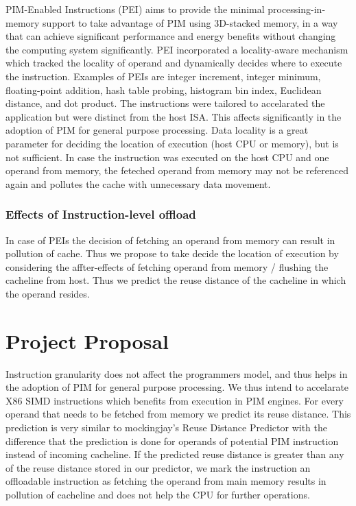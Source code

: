 \documentclass[a4paper,12pt, final]{report}
\begin{document}
PIM-Enabled Instructions (PEI)\cite{PEI_ISCA} aims to provide the minimal processing-in-memory 
support to take advantage of PIM using 3D-stacked memory, in
a way that can achieve significant performance and energy benefits without changing the 
computing system significantly. PEI incorporated a locality-aware mechanism
which tracked the locality of operand and dynamically decides where to execute
the instruction. Examples of PEIs are integer increment, integer minimum, floating-point 
addition, hash table probing, histogram bin index, Euclidean distance, and dot
product. The instructions were tailored to accelarated the application but were distinct 
from the host ISA. This affects significantly in the adoption of PIM for general
purpose processing. Data locality is a great parameter for deciding the
location of execution (host CPU or memory), but is not sufficient. In case the
instruction was executed on the host CPU and one operand from memory, the feteched operand
from memory may not be referenced again and pollutes the cache with unnecessary data movement.


\subsection{Effects of Instruction-level offload}
In case of PEIs the decision of fetching an operand
from memory can result in pollution of cache. Thus we propose to take decide
the location of execution by considering the affter-effects of fetching operand from
memory / flushing the cacheline from host. Thus we predict the reuse distance
of the cacheline in which the operand resides.  

\chapter{Project Proposal}
Instruction granularity does not affect the programmers model, and thus helps
in the adoption of PIM for general purpose processing. We thus intend to
accelarate X86 SIMD instructions which benefits from execution in PIM engines. For
every operand that needs to be fetched from memory we predict its reuse
distance. This prediction is very similar to mockingjay's\cite{mockingjay} Reuse Distance
Predictor with the difference that the prediction is done for operands of
potential PIM instruction instead of incoming cacheline. If the predicted reuse
distance is greater than any of the reuse distance stored in our predictor, we
mark the instruction an offloadable instruction as fetching the operand from
main memory results in pollution of cacheline and does not help the CPU for further 
operations. 


{}
\end{document}
